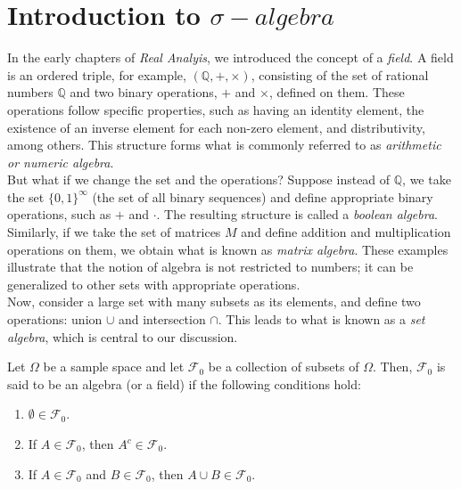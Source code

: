 \section{Introduction to $\sigma-algebra$}

In the early chapters of \textit{Real Analyis}, we introduced the concept of a \textit{field}. A field is an ordered triple, for example, $(\mathbb{Q}, +, \times)$, consisting of the set of rational numbers $\mathbb{Q}$ and two binary operations, $+$ and $\times$, defined on them. These operations follow specific properties, such as having an identity element, the existence of an inverse element for each non-zero element, and distributivity, among others. This structure forms what is commonly referred to as \textit{arithmetic or numeric algebra}.\\

But what if we change the set and the operations? Suppose instead of $\mathbb{Q}$, we take the set $\{0, 1\}^{\infty}$ (the set of all binary sequences) and define appropriate binary operations, such as $+$ and $\cdot$. The resulting structure is called a \textit{boolean algebra}. Similarly, if we take the set of matrices $M$ and define addition and multiplication operations on them, we obtain what is known as \textit{matrix algebra}. These examples illustrate that the notion of algebra is not restricted to numbers; it can be generalized to other sets with appropriate operations.\\

Now, consider a large set with many subsets as its elements, and define two operations: union $\cup$ and intersection $\cap$. This leads to what is known as a \textit{set algebra}, which is central to our discussion.\\

\begin{definition}
    Let $\Omega$ be a sample space and let $\mathcal{F}_0$ be a collection of subsets of $\Omega$. Then, $\mathcal{F}_0$ is said to be an algebra (or a field) if the following conditions hold:
\begin{enumerate}
    \item $\emptyset \in \mathcal{F}_0$.
    \item If $A \in \mathcal{F}_0$, then $A^c \in \mathcal{F}_0$.
    \item If $A \in \mathcal{F}_0$ and $B \in \mathcal{F}_0$, then $A \cup B \in \mathcal{F}_0$.
\end{enumerate}
\end{definition}

